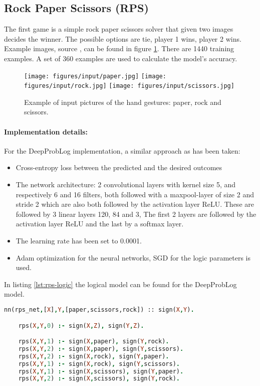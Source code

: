 \subsection{Rock Paper Scissors (RPS)}
The first game is a simple rock paper scissors solver that given two images decides the winner. The possible options are tie, player 1 wins, player 2 wins. Example images, source \cite{RPSLS-database}, can be found in figure \ref{fig:rps_input}. There are 1440 training examples. A set of 360 examples are used to calculate the model's accuracy. 

\begin{figure}[htp]
    \centering
    \texttt{[image: figures/input/paper.jpg]}\hfill
    \texttt{[image: figures/input/rock.jpg]}\hfill
    \texttt{[image: figures/input/scissors.jpg]}
    \caption{Example of input pictures of the hand gestures: paper, rock and scissors\cite{RPSLS-database}.} %
    \label{fig:rps_input}
\end{figure}

\paragraph{Implementation details:} For the DeepProbLog implementation, a similar approach as \cite{DBLP} has been taken:
\begin{itemize}
    \item Cross-entropy loss between the predicted and the desired outcomes
    \item The network architecture: 2 convolutional layers with kernel size 5, and respectively 6 and 16 filters, both followed with a maxpool-layer of size 2 and stride 2 which are also both followed by the activation layer ReLU. These are followed by 3 linear layers 120, 84 and 3, The first 2 layers are followed by the activation layer ReLU and the last by a softmax layer. \item The learning rate has been set to 0.0001. 
    \item Adam \cite{kingma2014adam} optimization for the neural networks, SGD for the logic parameters is used.
  \end{itemize}
  In listing \ref{lst:rps-logic} the logical model can be found for the DeepProbLog model.

  \begin{lstlisting}[label={lst:rps-logic},language=Prolog,frame=single,caption={Rock paper scissors DeepProbLog model},captionpos=b]
    nn(rps_net,[X],Y,[paper,scissors,rock]) :: sign(X,Y).

    rps(X,Y,0) :- sign(X,Z), sign(Y,Z).

    rps(X,Y,1) :- sign(X,paper), sign(Y,rock).
    rps(X,Y,2) :- sign(X,paper), sign(Y,scissors).
    rps(X,Y,2) :- sign(X,rock), sign(Y,paper).
    rps(X,Y,1) :- sign(X,rock), sign(Y,scissors).
    rps(X,Y,1) :- sign(X,scissors), sign(Y,paper).
    rps(X,Y,2) :- sign(X,scissors), sign(Y,rock).
    \end{lstlisting}


